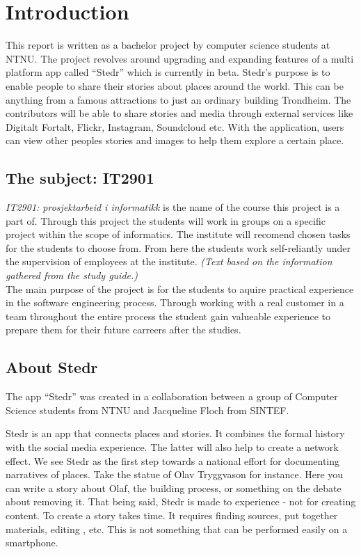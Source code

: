 \section{Introduction}
\thispagestyle{plain}
	\setcounter{page}{1}


This report is written as a bachelor project by computer science students at NTNU. The project revolves around upgrading and expanding features of a multi platform app called “Stedr” which is currently in beta. Stedr's purpose is to enable people to share their stories about places around the world. This can be anything from a famous attractions to just an ordinary building Trondheim. The contributors will be able to share stories and media through external services like Digitalt Fortalt, Flickr, Instagram, Soundcloud etc. With the application, users can view other peoples stories and images  to help them explore a certain place.

\subsection{The subject: IT2901}
\emph{IT2901: prosjektarbeid i informatikk} is the name of the course this project is a part of. Through this project the students will work in groups on a specific project within the scope of informatics. The institute will recomend chosen tasks for the students to choose from. From here the students work self-reliantly under the supervision of employees at the institute. \textit{(Text based on the information gathered from the study guide.)}\\ The main purpose of the project is for the students to aquire practical experience in the software engineering process. Through working with a real customer in a team throughout the entire process the student gain valueable experience to prepare them for their future carreers after the studies.

\subsection{About Stedr}
The app “Stedr” was created in a collaboration between a group of Computer Science students from NTNU and Jacqueline Floch from SINTEF. 

Stedr is an app that connects places and stories. It combines the formal history with the social media experience. The latter will also help to create a network effect. 
We see Stedr as the first step towards a national effort for documenting narratives of places. Take the statue of Olav Tryggvason for instance. Here you can write a story about Olaf, the building process, or something on the debate about removing it. That being said, Stedr is made to experience - not for creating content. To create a story takes time. It requires finding sources, put together materials, editing , etc. This is not something that can be performed easily on a smartphone.

